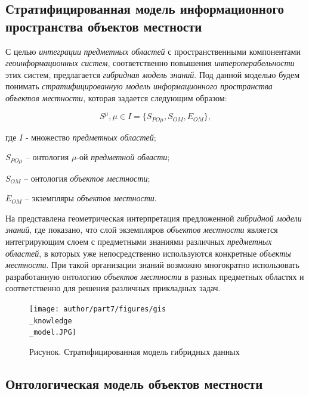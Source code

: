 \subsection{Стратифицированная модель информационного пространства объектов местности}
\label{chapter_gis_sec_strat_model}

С целью \textit{интеграции} \textit{предметных областей} с пространственными компонентами \textit{геоинформационных систем}, соответственно повышения \textit{интероперабельности} этих систем, предлагается \textit{гибридная модель знаний}. Под данной моделью будем понимать \textit{стратифицированную модель информационного пространства объектов местности}, которая задается следующим образом:

\begin{equation} 
\label{<eq2_1>} 
S^{\mu}, \mu  \in I = \{S_{PO\mu}, S_{OM}, E_{OM}\},
\end{equation} 

\parindent=8mm
\noindent \hangindent=22mm 
где $I$ - множество \textit{предметных областей};

\hangindent=22mm 
$S_{PO\mu}$ – онтология ${\mu}$-ой \textit{предметной области};

\hangindent=30mm 
$S_{OM}$ – онтология \textit{объектов местности};

\hangindent=30mm 
$E_{OM}$ – экземпляры \textit{объектов местности}.

На  представлена геометрическая интерпретация предложенной \textit{гибридной модели знаний}, где показано, что слой экземпляров \textit{объектов местности} является интегрирующим слоем с предметными знаниями различных \textit{предметных областей}, в которых уже непосредственно используются конкретные \textit{объекты местности}. При такой организации знаний возможно многократно использовать  разработанную онтологию \textit{объектов местности} в разных предметных областях и соответственно для решения различных прикладных задач.

\begin{figure}[H]
	\center
	\caption{Рисунок. Стратифицированная модель гибридных данных}
	\texttt{[image: author/part7/figures/gis\\\_knowledge\\\_model.JPG]}
	\label{fig:pic2_1}
\end{figure}

\subsection{Онтологическая модель объектов местности}
\label{chapter_gis_sec_onto_model}

